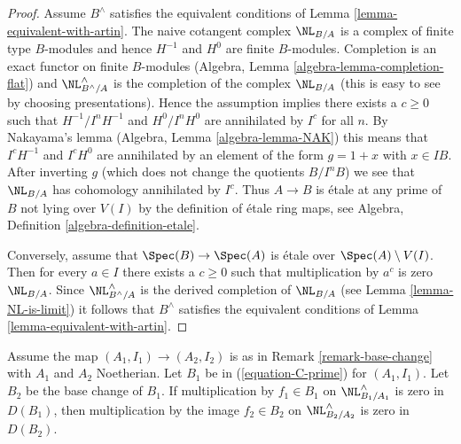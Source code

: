 \begin{proof}
Assume $B^\wedge$ satisfies the equivalent conditions of
Lemma \ref{lemma-equivalent-with-artin}.
The naive cotangent complex $\NL_{B/A}$ is a complex of finite type
$B$-modules and hence $H^{-1}$ and $H^0$ are finite $B$-modules.
Completion is an exact functor on finite $B$-modules (Algebra,
Lemma \ref{algebra-lemma-completion-flat}) and $\NL^\wedge_{B^\wedge/A}$
is the completion of the complex $\NL_{B/A}$ (this is easy to see
by choosing presentations).
Hence the assumption implies there exists a $c \geq 0$ such that
$H^{-1}/I^nH^{-1}$ and $H^0/I^nH^0$ are annihilated by $I^c$
for all $n$. By Nakayama's lemma (Algebra, Lemma \ref{algebra-lemma-NAK})
this means that $I^cH^{-1}$ and $I^cH^0$ are annihilated by an element
of the form $g = 1 + x$ with $x \in IB$. After inverting $g$
(which does not change the quotients $B/I^nB$)
we see that $\NL_{B/A}$ has cohomology annihilated by $I^c$. Thus
$A \to B$ is \'etale at any prime of $B$ not lying over $V(I)$
by the definition of \'etale ring maps, see
Algebra, Definition \ref{algebra-definition-etale}.

\medskip\noindent
Conversely, assume that $\Spec(B) \to \Spec(A)$ is \'etale over
$\Spec(A) \setminus V(I)$. Then for every $a \in I$ there exists
a $c \geq 0$ such that multiplication by $a^c$ is zero $\NL_{B/A}$.
Since $\NL^\wedge_{B^\wedge/A}$ is the derived completion of
$\NL_{B/A}$ (see Lemma \ref{lemma-NL-is-limit}) it follows that
$B^\wedge$ satisfies the equivalent conditions of
Lemma \ref{lemma-equivalent-with-artin}.
\end{proof}

\begin{lemma}
\label{lemma-zero-after-modding-out}
Assume the map $(A_1, I_1) \to (A_2, I_2)$ is as in
Remark \ref{remark-base-change} with $A_1$ and $A_2$ Noetherian.
Let $B_1$ be in (\ref{equation-C-prime}) for $(A_1, I_1)$.
Let $B_2$ be the base change of $B_1$.
If multiplication by $f_1 \in B_1$ on $\NL^\wedge_{B_1/A_1}$
is zero in $D(B_1)$, then multiplication by
the image $f_2 \in B_2$ on $\NL^\wedge_{B_2/A_2}$ is zero
in $D(B_2)$.
\end{lemma}

